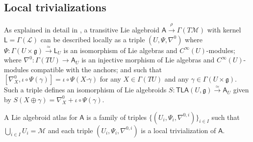 \documentclass[number]{elsarticle}
\theoremstyle{definition}
\theoremstyle{remark}
\numberwithin{equation}{section}
\begin{document}
\subsection{Local trivializations}

As explained in detail in \cite{Mack05a}, a transitive Lie algebroid ${{{{\mathbf{\mathsf{{A}}}}}}} \xrightarrow{\rho} \Gamma(T{{{{\mathcal{{M}}}}}})$ with kernel ${{{{\mathbf{\mathsf{{L}}}}}}} = \Gamma({{{{\mathcal{{L}}}}}})$ can be described locally as a triple $(U, \Psi, \nabla^0)$ where $\Psi : \Gamma(U \times {{\mathfrak g}}) \xrightarrow{\simeq} {{{{\mathbf{\mathsf{{L}}}}}}}_U$ is an isomorphism of Lie algebras and $C^\infty(U)$-modules; where $\nabla^0 :  \Gamma(TU) \rightarrow {{{{\mathbf{\mathsf{{A}}}}}}}_U$ is an injective morphism of Lie algebras and $C^\infty(U)$-modules compatible with the anchors; and such that $[\nabla^0_X, \iota \circ \Psi(\gamma) ] = \iota \circ \Psi(X {\mathord{\cdot}} \gamma)$ for any $X \in \Gamma(TU)$ and any $\gamma \in \Gamma(U \times {{\mathfrak g}})$. Such a triple defines an isomorphism of Lie algebroids $S : {{{{\mathbf{\mathsf{{TLA}}}}}}}(U, {{\mathfrak g}}) \xrightarrow{\simeq} {{{{\mathbf{\mathsf{{A}}}}}}}_U$ given by $S(X \oplus \gamma) = \nabla^0_X + \iota \circ \Psi(\gamma)$.

A Lie algebroid atlas for ${{{{\mathbf{\mathsf{{A}}}}}}}$ is a family of triples $\{(U_i, \Psi_i, \nabla^{0,i})\}_{i \in I}$ such that $\bigcup_{i \in I} U_i = {{{{\mathcal{{M}}}}}}$ and each triple $(U_i, \Psi_i, \nabla^{0,i})$ is a local trivialization of ${{{{\mathbf{\mathsf{{A}}}}}}}$.
\end{document}
